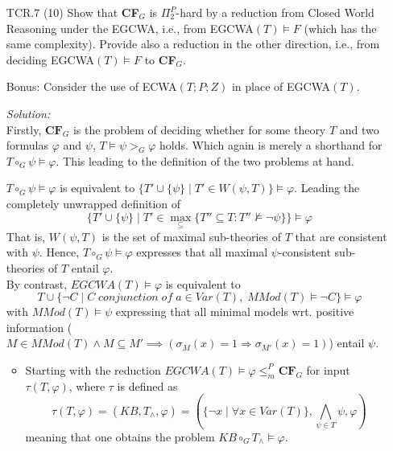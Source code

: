 \documentclass[11pt,a4paper]{article}
\newcommand{\nmodels}{\not\models}
\newcommand{\PiP}[1]{\ensuremath{\Pi^{{P}}_{#1}}\xspace}
\begin{document}
\begin{enumerate}
\newpage

\item[TCR.7]{(10)} Show that {\bf CF}$_G$ is $\PiP{2}$-hard by a reduction from
  Closed World Reasoning under the EGCWA, i.e., from EGCWA$(T)\models F$
  (which has the same complexity). Provide also a reduction in the other
  direction, i.e., from deciding EGCWA$(T)\models F$ to {\bf CF}$_G$.

Bonus: Consider the use of ECWA$(T;P;Z)$ in place of EGCWA$(T)$.\\


\bigskip

\emph{Solution:}\\

Firstly, $\textbf{CF}_G$ is the problem of deciding whether for some theory $T$ and two formulas $\varphi$ and $\psi$, $T\models \psi >_G \varphi$ holds. Which again is merely a shorthand for $T \circ_G \psi \models \varphi$. This leading to the definition of the two problems at hand.

$T \circ_G \psi \models \varphi	$ is equivalent to $ \{T' \cup \{\psi\} \mid T' \in W(\psi,T)\} \models \varphi$. Leading the completely unwrapped definition of 
\begin{equation*}
\{T' \cup \{\psi\} \mid T' \in  \max_{\subseteq}\{ T'' \subseteq T : T'' \nmodels \neg \psi\} \} \models \varphi
\end{equation*}
That is, $W(\psi,T)$ is the set of maximal sub-theories of $T$ that are consistent with $\psi$.
Hence, $T \circ_G \psi \models \varphi	$ expresses that all maximal $\psi$-consistent sub-theories of $T$ entail $\varphi$. \\

By contrast, $\mathit{EGCWA}(T) \models \varphi$ is equivalent to  
\begin{equation*}
T \cup \{\neg C \mid C \mathit{ \; conjunction \; of \; } a \in \mathit{Var}(T) , \;  \mathit{MMod}(T) \models \neg C  \} \models \varphi
\end{equation*}
with $\mathit{MMod}(T) \models \psi$ expressing that all minimal models wrt. positive information ($M \in \mathit{MMod}(T) \land M \subseteq M' \implies (\sigma_M(x)=1 \Rightarrow \sigma_{M'}(x)=1 )$) entail $\psi$.\\


\begin{itemize}


\item Starting with the reduction $\mathit{EGCWA}(T) \models \varphi  \leq_m^P \textbf{CF}_G $ for input $\tau(T,\varphi)$, where $\tau$ is defined as
\begin{equation*}
\tau(T, \varphi)  =  ( \mathit{KB}, T_{\land}, \varphi) = (\{ \neg x \mid \forall x \in \mathit{Var}(T)\}, \bigwedge_{\psi \in T} \psi, \varphi)
\end{equation*}
meaning that one obtains the problem $ \mathit{KB} \circ_G T_{\land} \models \varphi$. \\


\end{itemize}
\end{enumerate}
\end{document}
